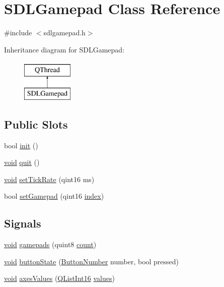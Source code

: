 \hypertarget{class_s_d_l_gamepad}{\section{S\-D\-L\-Gamepad Class Reference}
\label{class_s_d_l_gamepad}
}


{\ttfamily \#include $<$sdlgamepad.\-h$>$}

Inheritance diagram for S\-D\-L\-Gamepad\-:\begin{figure}[H]
\begin{center}
\leavevmode
\includegraphics[height=2.000000cm]{class_s_d_l_gamepad}
\end{center}
\end{figure}
\subsection*{Public Slots}
\begin{DoxyCompactItemize}
\item 
bool \hyperlink{class_s_d_l_gamepad_a9639243476c4164b5b81d8683a213692}{init} ()
\item 
\hyperlink{group___u_a_v_objects_plugin_ga444cf2ff3f0ecbe028adce838d373f5c}{void} \hyperlink{class_s_d_l_gamepad_aebce928aa8ee3e4cf04b6357b098f82c}{quit} ()
\item 
\hyperlink{group___u_a_v_objects_plugin_ga444cf2ff3f0ecbe028adce838d373f5c}{void} \hyperlink{class_s_d_l_gamepad_a5c83a83755fd9b5849caebebfc80ab92}{set\-Tick\-Rate} (qint16 ms)
\item 
bool \hyperlink{class_s_d_l_gamepad_aced2a7eda42d01515400ce56a0462661}{set\-Gamepad} (qint16 \hyperlink{glext_8h_ab47dd9958bcadea08866b42bf358e95e}{index})
\end{DoxyCompactItemize}
\subsection*{Signals}
\begin{DoxyCompactItemize}
\item 
\hyperlink{group___u_a_v_objects_plugin_ga444cf2ff3f0ecbe028adce838d373f5c}{void} \hyperlink{class_s_d_l_gamepad_a18305f7d7a3fdb519a946451cb48e0c5}{gamepads} (quint8 \hyperlink{glext_8h_a5b40aca7a9682963dd00a8f5aef0a901}{count})
\item 
\hyperlink{group___u_a_v_objects_plugin_ga444cf2ff3f0ecbe028adce838d373f5c}{void} \hyperlink{class_s_d_l_gamepad_acbcb440f27707ca17e0bd7528f78d06a}{button\-State} (\hyperlink{sdlgamepad_8h_a2054e2a6e47649b0ab9d043afda9133f}{Button\-Number} number, bool pressed)
\item 
\hyperlink{group___u_a_v_objects_plugin_ga444cf2ff3f0ecbe028adce838d373f5c}{void} \hyperlink{class_s_d_l_gamepad_a200686c2d85389ac2be751234f691cc1}{axes\-Values} (\hyperlink{sdlgamepad_8h_a0cff90f48b1cb30ecb36bbfea594b50b}{Q\-List\-Int16} \hyperlink{glext_8h_a300a8ed5fb9490aa35713406ec0412df}{values})
\end{DoxyCompactItemize}

